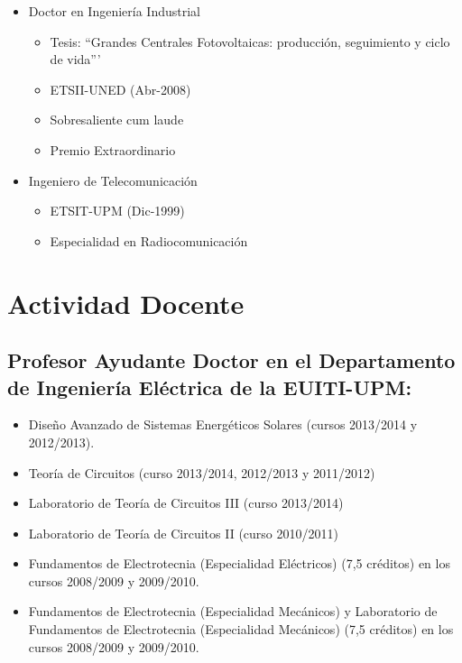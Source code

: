 \documentclass[article, a4paper]{memoir}
\begin{document}
\begin{itemize}
\item Doctor en Ingeniería Industrial
\begin{itemize}
\item Tesis: ``Grandes Centrales Fotovoltaicas: producción,
seguimiento y ciclo de vida'''
\item ETSII-UNED (Abr-2008)
\item Sobresaliente cum laude
\item Premio Extraordinario
\end{itemize}

\item Ingeniero de Telecomunicación
\begin{itemize}
\item ETSIT-UPM (Dic-1999)
\item Especialidad en Radiocomunicación
\end{itemize}
\end{itemize}

\section{Actividad Docente}
\label{sec-3}

\subsection{Profesor Ayudante Doctor en el Departamento de Ingeniería Eléctrica de la EUITI-UPM:}
\label{sec-3-1}

\begin{itemize}
\item Diseño Avanzado de Sistemas Energéticos Solares (cursos 2013/2014 y 2012/2013).

\item Teoría de Circuitos (curso 2013/2014, 2012/2013 y 2011/2012)

\item Laboratorio de Teoría de Circuitos III (curso 2013/2014)

\item Laboratorio de Teoría de Circuitos II (curso 2010/2011)

\item Fundamentos de Electrotecnia (Especialidad Eléctricos) (7,5
créditos) en los cursos 2008/2009 y 2009/2010.

\item Fundamentos de Electrotecnia (Especialidad Mecánicos) y Laboratorio
de Fundamentos de Electrotecnia (Especialidad Mecánicos) (7,5
créditos) en los cursos 2008/2009 y 2009/2010.
\end{itemize}
\end{document}

